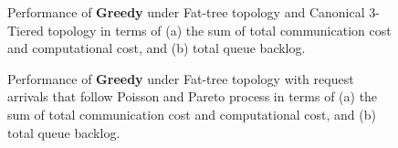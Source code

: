 \documentclass[10pt,journal,compsoc]{IEEEtran}
\begin{document}
\begin{figure}[!t]
\centering
 \caption{Performance of \textbf{Greedy} under Fat-tree topology and Canonical 3-Tiered topology in terms of (a) the sum of total communication cost and computational cost, and (b) total queue backlog.}
 \label{trace}
\end{figure}

\begin{figure}[!t]
	\centering
	
	\caption{Performance of \textbf{Greedy} under Fat-tree topology with request arrivals that follow Poisson and Pareto process in terms of (a) the sum of total communication cost and computational cost, and (b) total queue backlog.}
	\label{pp}
\end{figure}
\end{document}
